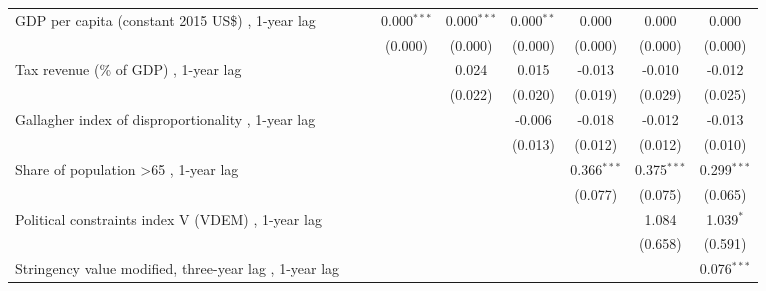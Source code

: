 \begin{table}[htbp]
\begin{tabular}{lcccccccc}
      GDP per capita (constant 2015 US\$) , 1-year lag                    &              &               & 0.000$^{***}$ & 0.000$^{***}$ & 0.000$^{**}$ & 0.000         & 0.000         & 0.000\\   
                                                                          &              &               & (0.000)       & (0.000)       & (0.000)      & (0.000)       & (0.000)       & (0.000)\\   
      Tax revenue (\% of GDP) , 1-year lag                                &              &               &               & 0.024         & 0.015        & -0.013        & -0.010        & -0.012\\   
                                                                          &              &               &               & (0.022)       & (0.020)      & (0.019)       & (0.029)       & (0.025)\\   
      Gallagher index of disproportionality , 1-year lag                  &              &               &               &               & -0.006       & -0.018        & -0.012        & -0.013\\   
                                                                          &              &               &               &               & (0.013)      & (0.012)       & (0.012)       & (0.010)\\   
      Share of population >65 , 1-year lag                                &              &               &               &               &              & 0.366$^{***}$ & 0.375$^{***}$ & 0.299$^{***}$\\   
                                                                          &              &               &               &               &              & (0.077)       & (0.075)       & (0.065)\\   
      Political constraints index V (VDEM) , 1-year lag                   &              &               &               &               &              &               & 1.084         & 1.039$^{*}$\\   
                                                                          &              &               &               &               &              &               & (0.658)       & (0.591)\\   
      Stringency value modified, three-year lag , 1-year lag              &              &               &               &               &              &               &               & 0.076$^{***}$\\   

\end{tabular}
\end{table}
